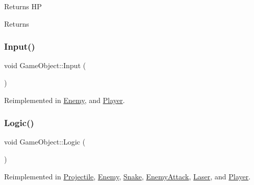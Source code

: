 Returns HP 

\begin{DoxyReturn}{Returns}

\end{DoxyReturn}
\mbox{\label{class_game_object_a430742cf91abb99337c556c88bef880a}} 
\subsubsection{\texorpdfstring{Input()}{Input()}}
{\footnotesize\ttfamily void Game\+Object\+::\+Input (\begin{DoxyParamCaption}{ }\end{DoxyParamCaption})\hspace{0.3cm}{\ttfamily [virtual]}}



Reimplemented in \mbox{\hyperlink{class_enemy_ad4958e67a70c706e37a80b285ac89854}{Enemy}}, and \mbox{\hyperlink{class_player_a65a76094cff6f149d5847d2110fe443d}{Player}}.

\mbox{\label{class_game_object_a79510ffc77339fe850491dce9f580fa9}} 
\subsubsection{\texorpdfstring{Logic()}{Logic()}}
{\footnotesize\ttfamily void Game\+Object\+::\+Logic (\begin{DoxyParamCaption}{ }\end{DoxyParamCaption})\hspace{0.3cm}{\ttfamily [virtual]}}



Reimplemented in \mbox{\hyperlink{class_projectile_a871e265207d2bf2d5180152a7acf2d40}{Projectile}}, \mbox{\hyperlink{class_enemy_adcde768475970dae1e4c3e76fb59bc46}{Enemy}}, \mbox{\hyperlink{class_snake_a1f01e21a73734f9c0d701ec02a9d2e41}{Snake}}, \mbox{\hyperlink{class_enemy_attack_a2f735b2cbf13787217a5daed7ff8f7a4}{Enemy\+Attack}}, \mbox{\hyperlink{class_laser_a1f2135281ecc1b318357633f4e7dd34c}{Laser}}, and \mbox{\hyperlink{class_player_ae30c8d49de94ee8c73ed6ab6315a2854}{Player}}.

\mbox{\label{class_game_object_a7aa67e2bbfd37af89d86df0b030b5a81}} 
